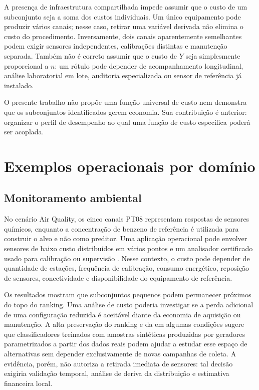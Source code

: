 A presença de infraestrutura compartilhada impede assumir que o custo de um subconjunto seja a soma dos custos individuais. Um único equipamento pode produzir vários canais; nesse caso, retirar uma variável derivada não elimina o custo do procedimento. Inversamente, dois canais aparentemente semelhantes podem exigir sensores independentes, calibrações distintas e manutenção separada. Também não é correto assumir que o custo de $Y$ seja simplesmente proporcional a $n$: um rótulo pode depender de acompanhamento longitudinal, análise laboratorial em lote, auditoria especializada ou sensor de referência já instalado.

\begin{interpretationbox}
O presente trabalho não propõe uma função universal de custo nem demonstra que os subconjuntos identificados gerem economia. Sua contribuição é anterior: organizar o perfil de desempenho ao qual uma função de custo específica poderá ser acoplada.
\end{interpretationbox}

\section{Exemplos operacionais por domínio}

\subsection{Monitoramento ambiental}

No cenário Air Quality, os cinco canais PT08 representam respostas de sensores químicos, enquanto a concentração de benzeno de referência é utilizada para construir o alvo e não como preditor. Uma aplicação operacional pode envolver sensores de baixo custo distribuídos em vários pontos e um analisador certificado usado para calibração ou supervisão \cite{devito2008,UciAirQuality2008}. Nesse contexto, o custo pode depender de quantidade de estações, frequência de calibração, consumo energético, reposição de sensores, conectividade e disponibilidade do equipamento de referência.

Os resultados mostram que subconjuntos pequenos podem permanecer próximos do topo do ranking. Uma análise de custo poderia investigar se a perda adicional de uma configuração reduzida é aceitável diante da economia de aquisição ou manutenção. A alta preservação do ranking e da \WinnersAgreement{} em algumas condições sugere que classificadores treinados com amostras sintéticas produzidas por geradores parametrizados a partir dos dados reais podem ajudar a estudar esse espaço de alternativas sem depender exclusivamente de novas campanhas de coleta. A evidência, porém, não autoriza a retirada imediata de sensores: tal decisão exigiria validação temporal, análise de deriva da distribuição e estimativa financeira local.

